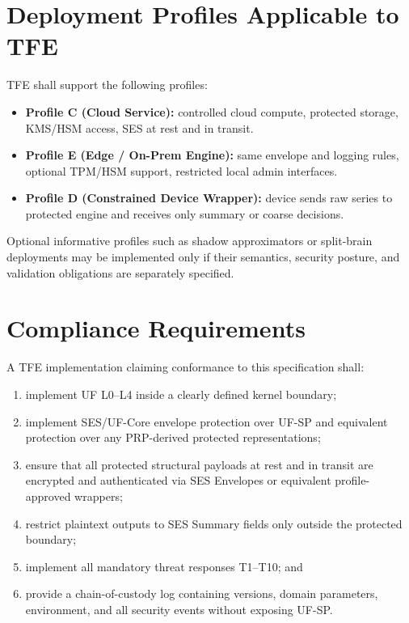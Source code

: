 \section{Deployment Profiles Applicable to TFE}

TFE shall support the following profiles:
\begin{itemize}
    \item \textbf{Profile C (Cloud Service):} controlled cloud compute, protected storage, KMS/HSM access, SES at rest and in transit.
    \item \textbf{Profile E (Edge / On-Prem Engine):} same envelope and logging rules, optional TPM/HSM support, restricted local admin interfaces.
    \item \textbf{Profile D (Constrained Device Wrapper):} device sends raw series to protected engine and receives only summary or coarse decisions.
\end{itemize}

Optional informative profiles such as shadow approximators or split-brain deployments may be implemented only if their semantics, security posture, and validation obligations are separately specified.

\section{Compliance Requirements}

A TFE implementation claiming conformance to this specification shall:
\begin{enumerate}[leftmargin=1.2cm]
    \item implement UF L0--L4 inside a clearly defined kernel boundary;
    \item implement SES/UF-Core envelope protection over UF-SP and equivalent protection over any PRP-derived protected representations;
    \item ensure that all protected structural payloads at rest and in transit are encrypted and authenticated via SES Envelopes or equivalent profile-approved wrappers;
    \item restrict plaintext outputs to SES Summary fields only outside the protected boundary;
    \item implement all mandatory threat responses T1--T10; and
    \item provide a chain-of-custody log containing versions, domain parameters, environment, and all security events without exposing UF-SP.
\end{enumerate}
